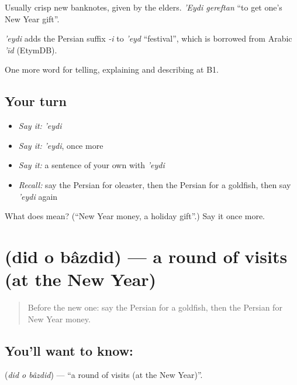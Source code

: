 Usually crisp new banknotes, given by the elders. \emph{'Eydi gereftan} \textquotedblleft{}to get one's New Year gift\textquotedblright{}.

\begin{cousinweb}
\emph{'eydi} adds the Persian suffix \emph{-i} to \emph{'eyd} \textquotedblleft{}festival\textquotedblright{}, which is borrowed from Arabic \emph{'īd} (EtymDB).
\end{cousinweb}

\begin{grammarlens}[title={What you've built}]
One more word for telling, explaining and describing at B1.
\end{grammarlens}

\subsection*{Your turn}
\begin{itemize}
\raggedright
  \item \emph{Say it:} \emph{'eydi}
  \item \emph{Say it:} \emph{'eydi}, once more
  \item \emph{Say it:} a sentence of your own with \emph{'eydi}
  \item \emph{Recall:} say the Persian for oleaster, then the Persian for a goldfish, then say \emph{'eydi} again
\end{itemize}

\begin{tcolorbox}[breakable,colback=teal!4,colframe=teal!35!black,title={Before you move on}]
What does  mean? (\textquotedblleft{}New Year money, a holiday gift\textquotedblright{}.) Say it once more.
\end{tcolorbox}
\section[\texorpdfstring{\fa{دید} \fa{و} \fa{بازدید} (did o bâzdid)}{دید و بازدید (did o bâzdid)}]{   (did o bâzdid) — a round of visits (at the New Year)}

\label{lesson:FA-C340-did-o-bazdid}



\begin{quote}
Before the new one: say the Persian for a goldfish, then the Persian for New Year money.
\end{quote}

\subsection*{You'll want to know:   }
\textbf{  } (\emph{did o bâzdid}) — \textquotedblleft{}a round of visits (at the New Year)\textquotedblright{}.

